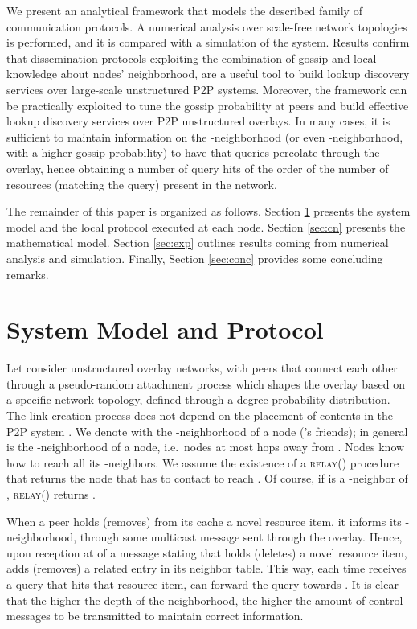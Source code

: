 \documentclass{sig-alternate}
\begin{document}
We present an analytical framework that models the described family of communication protocols. A numerical analysis over scale-free network topologies is performed, and it is compared with a simulation of the system. 
Results confirm that dissemination protocols exploiting the combination of gossip and local knowledge about nodes' neighborhood, are a useful tool to build lookup discovery services over large-scale unstructured P2P systems. 
Moreover, the framework can be practically exploited to tune the gossip probability at peers and build effective lookup discovery services over P2P unstructured overlays.
In many cases, it is sufficient to maintain information on the -neighborhood (or even -neighborhood, with a higher gossip probability) to have that queries percolate through the overlay, hence obtaining a number of query hits of the order of the number of resources (matching the query) present in the network.



The remainder of this paper is organized as follows. Section \ref{sec:model} presents the system model and the local protocol executed at each node. Section \ref{sec:cn} presents the mathematical model. Section \ref{sec:exp} outlines results coming from numerical analysis and simulation. Finally, Section \ref{sec:conc} provides some concluding remarks.


\section{System Model and Protocol}\label{sec:model}

Let consider unstructured overlay networks, with peers that connect each other through a pseudo-random attachment process which shapes the overlay based on a specific network topology, defined through a degree probability distribution. The link creation process does not depend on the placement of contents in the P2P system \cite{ferretti_trans.cs.2012.10-12.e2}.
We denote with  the -neighbor\-hood of a node  ('s friends); in general  is the -neighborhood of a node, i.e.~nodes at most  hops away from . 
Nodes know how to reach all its -neighbors. We assume the existence of a \textsc{relay}() procedure that returns the node that  has to contact to reach . Of course, if  is a -neighbor of , \textsc{relay}() returns .

When a peer  holds (removes) from its cache a novel resource item, it informs its -neighborhood, through some multicast message sent through the overlay.
Hence, upon reception at  of a message stating that  holds (deletes) a novel resource item,  adds (removes) a related entry in its neighbor table. 
This way, each time  receives a query that hits that resource item,  can forward the query towards .
It is clear that the higher the depth  of the neighborhood, the higher the amount of control messages to be transmitted to maintain correct information.
\end{document}
